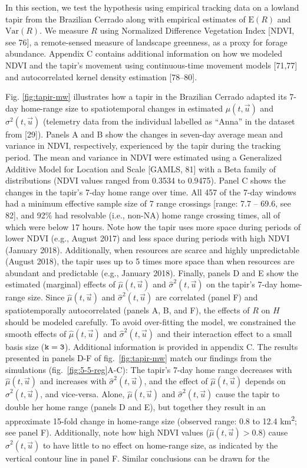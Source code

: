 \documentclass[
  12pt,
]{article}
\begin{document}
In this section, we test the hypothesis using empirical tracking data on a lowland tapir from the Brazilian Cerrado along with empirical estimates of \(\text{E}(R)\) and \(\text{Var}(R)\). We measure \(R\) using Normalized Difference Vegetation Index {[}NDVI, see 76{]}, a remote-sensed measure of landscape greenness, as a proxy for forage abundance. Appendix C contains additional information on how we modeled NDVI and the tapir's movement using continuous-time movement models {[}71,77{]} and autocorrelated kernel density estimation {[}78--80{]}.

Fig. \ref{fig:tapir-mw} illustrates how a tapir in the Brazilian Cerrado adapted its 7-day home-range size to spatiotemporal changes in estimated \(\mu(t, \vec u)\) and \(\sigma^2(t, \vec u)\) (telemetry data from the individual labelled as ``Anna'' in the dataset from {[}29{]}). Panels A and B show the changes in seven-day average mean and variance in NDVI, respectively, experienced by the tapir during the tracking period. The mean and variance in NDVI were estimated using a Generalized Additive Model for Location and Scale {[}GAMLS, 81{]} with a Beta family of distributions (NDVI values ranged from 0.3534 to 0.9475). Panel C shows the changes in the tapir's 7-day home range over time. All 457 of the 7-day windows had a minimum effective sample size of 7 range crossings {[}range: 7.7 -- 69.6, see 82{]}, and 92\% had resolvable (i.e., non-NA) home range crossing times, all of which were below 17 hours. Note how the tapir uses more space during periods of lower NDVI (e.g., August 2017) and less space during periods with high NDVI (January 2018). Additionally, when resources are scarce and highly unpredictable (August 2018), the tapir uses up to 5 times more space than when resources are abundant and predictable (e.g., January 2018). Finally, panels D and E show the estimated (marginal) effects of \(\hat\mu(t, \vec u)\) and \(\hat\sigma^2(t, \vec u)\) on the tapir's 7-day home-range size. Since \(\hat\mu(t, \vec u)\) and \(\hat\sigma^2(t, \vec u)\) are correlated (panel F) and spatiotemporally autocorrelated (panels A, B, and F), the effects of \(R\) on \(H\) should be modeled carefully. To avoid over-fitting the model, we constrained the smooth effects of \(\hat\mu(t, \vec u)\) and \(\hat\sigma^2(t, \vec u)\) and their interaction effect to a small basis size (\(\tt{k = 3}\)). Additional information is provided in appendix C. The results presented in panels D-F of fig.~\ref{fig:tapir-mw} match our findings from the simulations (fig.~\ref{fig:5-5-reg}A-C): The tapir's 7-day home range decreases with \(\hat\mu(t, \vec u)\) and increases with \(\hat\sigma^2(t, \vec u)\), and the effect of \(\hat\mu(t, \vec u)\) depends on \(\hat\sigma^2(t, \vec u)\), and vice-versa. Alone, \(\hat\mu(t, \vec u)\) and \(\hat\sigma^2(t, \vec u)\) cause the tapir to double her home range (panels D and E), but together they result in an approximate 15-fold change in home-range size (observed range: 0.8 to 12.4 km\textsuperscript{2}; see panel F). Additionally, note how high NDVI values (\(\hat \mu(t, \vec u) > 0.8\)) cause \(\hat\sigma^2(t, \vec u)\) to have little to no effect on home-range size, as indicated by the vertical contour line in panel F. Similar conclusions can be drawn for the 
\end{document}

